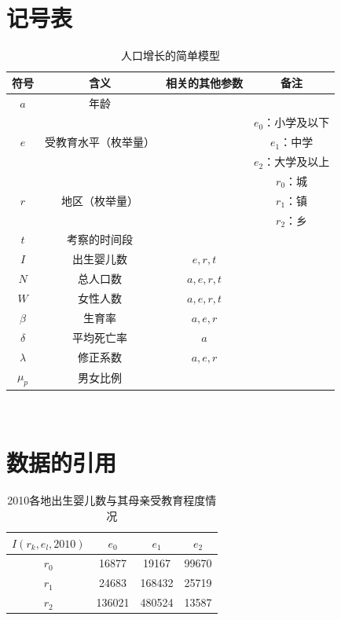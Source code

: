 \documentclass[a4paper]{article}
\begin{document}
\section{记号表}
	\begin{table}[H]
		\centering
		\caption{人口增长的简单模型}
		\label{simple_symbol}
		\begin{tabular}{cccc}
			\hline
			符号		&	含义									&	相关的其他参数	&	备注 \\
			\hline
			$a$			&	年龄									&	& \\							&&&$e_0$：小学及以下\\
			$e$			&	受教育水平（枚举量）	&									& 	$e_1$：中学	\\	&&&$e_2$：大学及以上	\\&&&$r_0$：城\\
			$r$			&	地区（枚举量）				&									& $r_1$：镇	\\	&&&$r_2$：乡	\\
			$t$			&	考察的时间段					&	& \\
			$I$			&	出生婴儿数						&	$e,r,t$		& \\
			$N$			&	总人口数							&	$a,e,r,t$ & \\
			$W$		&	女性人数							&	$a,e,r,t$	& \\
			$\beta$	&	生育率								&	$a,e,r$	& \\
			$\delta$	&	平均死亡率						&	$a$			& \\
			$\lambda$	&	修正系数						&	$a,e,r$	& \\
			$\mu_p$& 男女比例								&	& \\
			\hline
		\end{tabular} \\
	\end{table}
\section{数据的引用}
	\begin{table}[H]
		\centering
		\caption{2010各地出生婴儿数与其母亲受教育程度情况}
		\label{simple_data}
		\begin{tabular}{c|ccc}
			$I(r_k, e_l, 2010)$		&	$e_0$		&	$e_1$		&	$e_2$ \\
			\hline
			$r_0$							&	16877		&	19167		&	99670	\\
			$r_1$							&	24683		&	168432	&	25719	\\
			$r_2$							&	136021	&	480524	&	13587	\\
		\end{tabular}
	\end{table}
\end{document}
